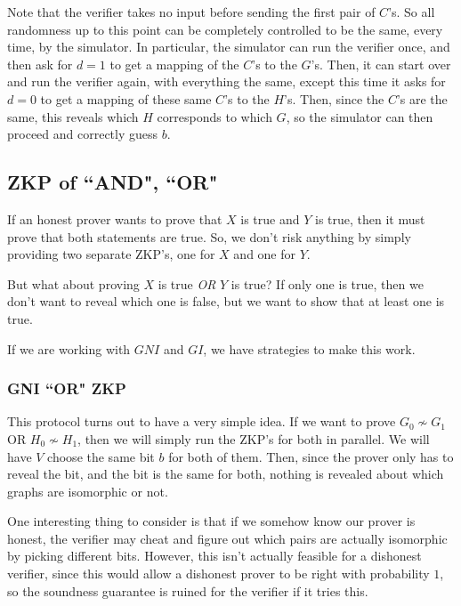 \documentclass[11pt]{article}
\begin{document}
Note that the verifier takes no input before sending the first pair of \(C\)'s. So all randomness up to this point can be completely controlled to be the same, every time, by the simulator. In particular, the simulator can run the verifier once, and then ask for \(d=1\) to get a mapping of the \(C\)'s to the \(G\)'s. Then, it can start over and run the verifier again, with everything the same, except this time it asks for \(d=0\) to get a mapping of these same \(C\)'s to the \(H\)'s. Then, since the \(C\)'s are the same, this reveals which \(H\) corresponds to which \(G\), so the simulator can then proceed and correctly guess \(b\).

\subsection{ZKP of ``AND", ``OR"}
If an honest prover wants to prove that \(X\) is true and \(Y\) is true, then it must prove that both statements are true. So, we don't risk anything by simply providing two separate ZKP's, one for \(X\) and one for \(Y\).\bigskip

But what about proving \(X\) is true \emph{OR} \(Y\) is true? If only one is true, then we don't want to reveal which one is false, but we want to show that at least one is true.\smallskip

If we are working with \(GNI\) and \(GI\), we have strategies to make this work.

\subsubsection{GNI ``OR" ZKP}
This protocol turns out to have a very simple idea. If we want to prove \(G_0\not\sim G_1\) OR \(H_0\not\sim H_1\), then we will simply run the ZKP's for both in parallel. We will have \(V\) choose the same bit \(b\) for both of them. Then, since the prover only has to reveal the bit, and the bit is the same for both, nothing is revealed about which graphs are isomorphic or not.\medskip

One interesting thing to consider is that if we somehow know our prover is honest, the verifier may cheat and figure out which pairs are actually isomorphic by picking different bits. However, this isn't actually feasible for a dishonest verifier, since this would allow a dishonest prover to be right with probability \(1\), so the soundness guarantee is ruined for the verifier if it tries this. 
\end{document}

